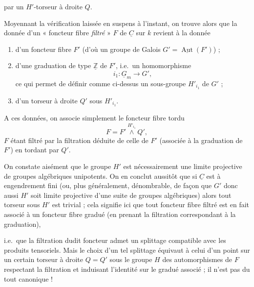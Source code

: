 \documentclass[11pt,a4paper]{article}
\begin{document}
par un $H'$-torseur à droite $Q$.

Moyennant la vérification laissée en suspens à l'instant, on trouve alors que
la donnée d'un « foncteur fibre \emph{filtré} » $F$ de $\underline{C}$ sur $k$
revient à la donnée

\begin{enumerate}
\item[(i)] d'un foncteur fibre $F'$  (d'où un groupe de Galois
$G' = \underline{\operatorname{Aut}}(F')$) ;
\item[(ii)] d'une graduation de type $\underline{\mathbb{Z}}$ de $F'$, i.e.\ un
homomorphisme
\[
i_{1} : \underline{G}_{m} \longrightarrow G' ,
\]
ce qui permet de définir comme ci-dessus un sous-groupe $H'_{i_{1}}$ de $G'$ ;
\item[(iii)] d'un torseur à droite $Q'$ sous $H'_{i_{1}}$.
\end{enumerate}

A ces données, on associe simplement le foncteur fibre tordu
\[
F = F' \overset{H'_{i_{1}}}{\wedge} Q' ,
\]
$F$ étant filtré par la filtration déduite de celle de $F'$
\struck{\ill{}} (associée à la graduation de $F'$) en tordant par $Q'$.


On constate aisément que le groupe $H'$ est nécessairement une limite
projective de groupes algébriques unipotents. On en conclut aussitôt que si
$\underline{C}$ est à engendrement fini (ou, plus généralement,  dénombrable, de façon que $G'$ donc aussi $H'$ soit limite
projective d'une suite de groupes algébriques) alors tout torseur sous $H'$
est trivial ; cela signifie ici que tout foncteur fibre filtré est en fait
associé à un foncteur fibre gradué (en prenant la filtration correspondant à
la graduation),

i.e.\ que la filtration dudit foncteur admet un splittage compatible avec les
produits tensoriels. Mais le choix d'un tel splittage équivaut à celui d'un
point sur un certain torseur à droite $Q = Q'$ sous le 
groupe  $H$ des automorphismes de $F$ respectant la
filtration et induisant l'identité sur le gradué associé ; il n'est pas du
tout canonique !
\end{document}

